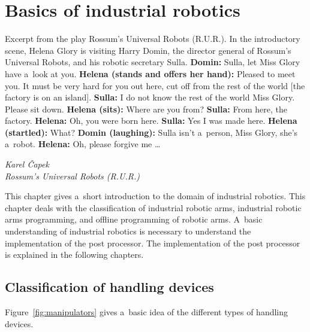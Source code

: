 ﻿\chapter{Basics of industrial robotics \label{chap:basics}}

\epigraph{

Excerpt from the play Rossum’s Universal Robots (R.U.R.).\break
In the introductory scene, Helena Glory is visiting Harry Domin, the director general of Rossum’s Universal Robots, and his robotic secretary Sulla.\break
\break
\textbf{Domin:} Sulla, let Miss Glory have a~look at you.\break
\textbf{Helena (stands and offers her hand):} Pleased to meet you. It must be very hard for you out here, cut off from the rest of the world [the factory is on an island].\break
\textbf{Sulla:} I do not know the rest of the world Miss Glory. Please sit down.\break
\textbf{Helena (sits):} Where are you from?\break
\textbf{Sulla:} From here, the factory.\break
\textbf{Helena:} Oh, you were born here.\break
\textbf{Sulla:} Yes I was made here.\break
\textbf{Helena (startled):} What?\break
\textbf{Domin (laughing):} Sulla isn’t a~person, Miss Glory, she’s a~robot.\break
\textbf{Helena:} Oh, please forgive me …
}{\textit{Karel Čapek \\ Rossum’s Universal Robots (R.U.R.)}}

This chapter gives a~short introduction to the domain of industrial robotics. This chapter deals with the classification of industrial robotic arms, industrial robotic arms programming, and offline programming of robotic arms. A~basic understanding of industrial robotics is necessary to understand the implementation of the post processor. The implementation of the post processor is explained in the following chapters.

\section{Classification of handling devices}

Figure~\ref{fig:manipulators} gives a~basic idea of the different types of handling devices. 


